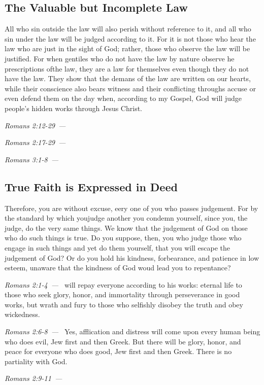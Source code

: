 \documentclass[10pt]{article}
\let\oldquote\quote
\let\endoldquote\endquote
\renewenvironment{quote}[2][]
  {\if\relax\detokenize{#1}\relax
     \def\quoteauthor{#2}%
   \else
     \def\quoteauthor{#2~---~#1}%
   \fi
   \oldquote}
  {\par\nobreak\smallskip\hfill\textit{\quoteauthor}%
   \endoldquote\addvspace{\bigskipamount}}
\begin{document}
\subsection*{The Valuable but Incomplete Law}
\begin{quote}{Romans 2:12-29}
All who sin outside the law will also perish without reference to it, and all who sin under the law will be judged according to it. For it is not those who hear the law who are just in the sight of God; rather, those who observe the law will be justified. For when gentiles who do not have the law by nature observe he prescriptions ofthe law, they are a law for themselves even though they do not have the law. They show that the demans of the law are written on our hearts, while their conscience also bears witness and their conflicting throughs accuse or even defend them on the day when, according to my Gospel, God will judge people's hidden works through Jesus Christ.
\end{quote}
\begin{quote}{Romans 2:17-29}
\end{quote}
\begin{quote}{Romans 3:1-8}
\end{quote}


\subsection*{True Faith is Expressed in Deed}
\begin{quote}{Romans 2:1-4}
Therefore, you are without excuse, eery one of you who passes judgement. For by the standard by which youjudge another you condemn yourself, since you, the judge, do the very same things. We know that the judgement of God on those who do such things is true. Do you suppose, then, you who judge those who engage in such things and yet do them yourself, that you will escape the judgement of God? Or do you hold his kindness, forbearance, and patience in low esteem, unaware that the kindness of God woud lead you to repentance?
\end{quote}
\begin{quote}{Romans 2:6-8}
[God] will repay everyone according to his works: eternal life to those who seek glory, honor, and immortality through perseverance in good works, but wrath and fury to those who selfishly disobey the truth and obey wickedness.
\end{quote}
\begin{quote}{Romans 2:9-11}
Yes, afflication and distress will come upon every human being who does evil, Jew first and then Greek. But there will be glory, honor, and peace for everyone who does good, Jew first and then Greek. There is no partiality with God.
\end{quote}
\end{document}
